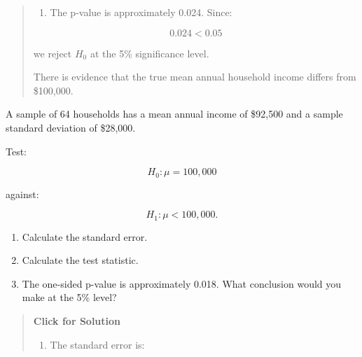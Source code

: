 \documentclass[
  letterpaper,
  DIV=11,
  numbers=noendperiod]{scrreprt}
\providecommand{\tightlist}{%
  \setlength{\itemsep}{0pt}\setlength{\parskip}{0pt}}
\begin{document}
\begin{tcolorbox}
\begin{quote}
\begin{enumerate}
\def\labelenumi{\alph{enumi}.}
\setcounter{enumi}{2}
\tightlist
\item
  The p-value is approximately 0.024. Since:
\end{enumerate}

\[
0.024 < 0.05
\]

we reject \(H_0\) at the 5\% significance level.

There is evidence that the true mean annual household income differs
from \$100,000.
\end{quote}

\end{tcolorbox}

\begin{tcolorbox}[enhanced jigsaw, arc=.35mm, bottomrule=.15mm, bottomtitle=1mm, breakable, colback=white, colbacktitle=quarto-callout-note-color!10!white, colframe=quarto-callout-note-color-frame, coltitle=black, left=2mm, leftrule=.75mm, opacityback=0, opacitybacktitle=0.6, rightrule=.15mm, title=\textcolor{quarto-callout-note-color}{\faInfo}\hspace{0.5em}{Question 9}, titlerule=0mm, toprule=.15mm, toptitle=1mm]

A sample of 64 households has a mean annual income of \$92,500 and a
sample standard deviation of \$28,000.

Test:

\[
H_0: \mu = 100{,}000
\]

against:

\[
H_1: \mu < 100{,}000.
\]

\begin{enumerate}
\def\labelenumi{\alph{enumi}.}
\tightlist
\item
  Calculate the standard error.\\
\item
  Calculate the test statistic.\\
\item
  The one-sided p-value is approximately 0.018. What conclusion would
  you make at the 5\% level?
\end{enumerate}

\begin{quote}
\textbf{Click for Solution}

\begin{enumerate}
\def\labelenumi{\alph{enumi}.}
\tightlist
\item
  The standard error is:
\end{enumerate}


\end{quote}
\end{tcolorbox}
\end{document}
